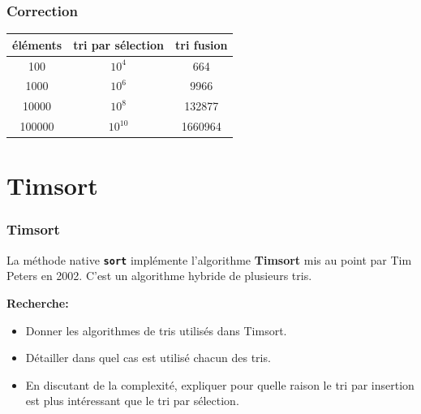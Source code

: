 \documentclass[svgnames,11pt]{beamer}
\begin{document}
\begin{frame}
    \frametitle{Correction}

    \begin{center}
        \begin{tabular}{|*{3}{c|}}
            \hline
            éléments & tri par sélection & tri fusion\\
            \hline
            100&$10^4$&664\\
            \hline
            1000&$10^6$&9966\\
            \hline
            10000&$10^8$&132877\\
            \hline
            100000&$10^{10}$&1660964\\
            \hline
        \end{tabular}
    \end{center}

\end{frame}
\section{Timsort}
\begin{frame}
    \frametitle{Timsort}

La méthode native \textbf{\texttt{sort}} implémente l’algorithme \textbf{Timsort} mis au point par Tim Peters en 2002. C’est un algorithme hybride de plusieurs tris.

\begin{activite}
\textbf{Recherche:}
\begin{itemize}
    \item Donner les algorithmes de tris utilisés dans Timsort.
    \item Détailler dans quel cas est utilisé chacun des tris.
    \item En discutant de la complexité, expliquer pour quelle raison le tri par insertion est plus intéressant que le tri par sélection.
\end{itemize}
\end{activite}
\end{frame}
\end{document}
